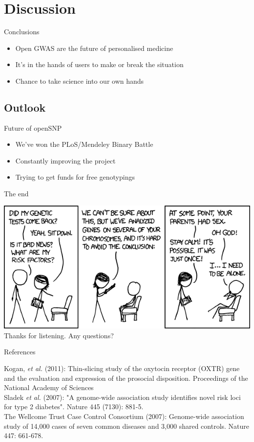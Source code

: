 \documentclass[12pt,a4paper]{beamer}
\begin{document}
\section{Discussion}
\begin{frame}{Conclusions}
\begin{itemize}
\item Open GWAS are the future of personalised medicine
\pause \item It's in the hands of users to make or break the situation
\pause \item Chance to take science into our own hands %
\end{itemize}
\end{frame}

\subsection{Outlook}
\begin{frame}{Future of openSNP}
\begin{itemize}
\item We've won the PLoS/Mendeley Binary Battle
\pause \item Constantly improving the project
\pause \item Trying to get funds for free genotypings
\end{itemize}
\end{frame}

\begin{frame}{The end}
\begin{center}
\includegraphics[scale=0.5]{genetic_analysis.png} \\
Thanks for listening. Any questions?
\end{center}
\end{frame}


\begin{frame}{References}
\begin{tiny}
Kogan, \textit{et al.} (2011): Thin-slicing study of the oxytocin receptor (OXTR) gene and the evaluation and expression of the prosocial disposition. Proceedings of the National Academy of Sciences\\
Sladek \textit{et al.} (2007): "A genome-wide association study identifies novel risk loci for type 2 diabetes". Nature 445 (7130): 881-5. \\
The Wellcome Trust Case Control Consortium  (2007): Genome-wide association study of 14,000 cases of seven common diseases and 3,000 shared controls. Nature 447: 661-678.\\
\end{tiny}
\end{frame}
\end{document}

